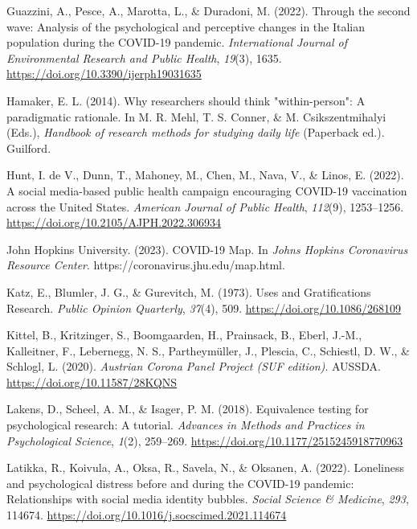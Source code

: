 \documentclass[
  man,mask,floatsintext]{apa7}
\newlength{\cslhangindent}
\newlength{\cslentryspacingunit} %
\newenvironment{CSLReferences}[2] %
 {%
  \setlength{\parindent}{0pt}
  \ifodd #1
  \let\oldpar\par
  \def\par{\hangindent=\cslhangindent\oldpar}
  \fi
  \setlength{\parskip}{#2\cslentryspacingunit}
 }%
 {}
\begin{document}
\begin{CSLReferences}{1}{0}
\leavevmode{}%
Guazzini, A., Pesce, A., Marotta, L., \& Duradoni, M. (2022). Through the second wave: {Analysis} of the psychological and perceptive changes in the {Italian} population during the {COVID-19} pandemic. \emph{International Journal of Environmental Research and Public Health}, \emph{19}(3), 1635. \url{https://doi.org/10.3390/ijerph19031635}

\leavevmode{}%
Hamaker, E. L. (2014). Why researchers should think "within-person": {A} paradigmatic rationale. In M. R. Mehl, T. S. Conner, \& M. Csikszentmihalyi (Eds.), \emph{Handbook of research methods for studying daily life} (Paperback ed.). {Guilford}.

\leavevmode{}%
Hunt, I. de V., Dunn, T., Mahoney, M., Chen, M., Nava, V., \& Linos, E. (2022). A social media-based public health campaign encouraging {COVID-19} vaccination across the {United States}. \emph{American Journal of Public Health}, \emph{112}(9), 1253--1256. \url{https://doi.org/10.2105/AJPH.2022.306934}

\leavevmode{}%
John Hopkins University. (2023). {COVID-19 Map}. In \emph{Johns Hopkins Coronavirus Resource Center}. https://coronavirus.jhu.edu/map.html.

\leavevmode{}%
Katz, E., Blumler, J. G., \& Gurevitch, M. (1973). Uses and {Gratifications Research}. \emph{Public Opinion Quarterly}, \emph{37}(4), 509. \url{https://doi.org/10.1086/268109}

\leavevmode{}%
Kittel, B., Kritzinger, S., Boomgaarden, H., Prainsack, B., Eberl, J.-M., Kalleitner, F., Lebernegg, N. S., Partheymüller, J., Plescia, C., Schiestl, D. W., \& Schlogl, L. (2020). \emph{Austrian {Corona Panel Project} ({SUF} edition)}. {AUSSDA}. \url{https://doi.org/10.11587/28KQNS}

\leavevmode{}%
Lakens, D., Scheel, A. M., \& Isager, P. M. (2018). Equivalence testing for psychological research: {A} tutorial. \emph{Advances in Methods and Practices in Psychological Science}, \emph{1}(2), 259--269. \url{https://doi.org/10.1177/2515245918770963}

\leavevmode{}%
Latikka, R., Koivula, A., Oksa, R., Savela, N., \& Oksanen, A. (2022). Loneliness and psychological distress before and during the {COVID-19} pandemic: {Relationships} with social media identity bubbles. \emph{Social Science \& Medicine}, \emph{293}, 114674. \url{https://doi.org/10.1016/j.socscimed.2021.114674}


\end{CSLReferences}
\end{document}
